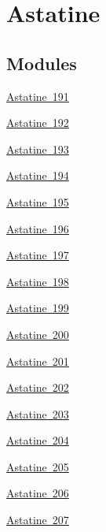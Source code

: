 \hypertarget{group___isotope_const-_astatine}{}\section{Astatine}
\label{group___isotope_const-_astatine}
\subsection*{Modules}
\begin{DoxyCompactItemize}
\item 
\mbox{\hyperlink{group___isotope_const-_astatine-_at191}{Astatine 191}}
\item 
\mbox{\hyperlink{group___isotope_const-_astatine-_at192}{Astatine 192}}
\item 
\mbox{\hyperlink{group___isotope_const-_astatine-_at193}{Astatine 193}}
\item 
\mbox{\hyperlink{group___isotope_const-_astatine-_at194}{Astatine 194}}
\item 
\mbox{\hyperlink{group___isotope_const-_astatine-_at195}{Astatine 195}}
\item 
\mbox{\hyperlink{group___isotope_const-_astatine-_at196}{Astatine 196}}
\item 
\mbox{\hyperlink{group___isotope_const-_astatine-_at197}{Astatine 197}}
\item 
\mbox{\hyperlink{group___isotope_const-_astatine-_at198}{Astatine 198}}
\item 
\mbox{\hyperlink{group___isotope_const-_astatine-_at199}{Astatine 199}}
\item 
\mbox{\hyperlink{group___isotope_const-_astatine-_at200}{Astatine 200}}
\item 
\mbox{\hyperlink{group___isotope_const-_astatine-_at201}{Astatine 201}}
\item 
\mbox{\hyperlink{group___isotope_const-_astatine-_at202}{Astatine 202}}
\item 
\mbox{\hyperlink{group___isotope_const-_astatine-_at203}{Astatine 203}}
\item 
\mbox{\hyperlink{group___isotope_const-_astatine-_at204}{Astatine 204}}
\item 
\mbox{\hyperlink{group___isotope_const-_astatine-_at205}{Astatine 205}}
\item 
\mbox{\hyperlink{group___isotope_const-_astatine-_at206}{Astatine 206}}
\item 
\mbox{\hyperlink{group___isotope_const-_astatine-_at207}{Astatine 207}}
\item 

\end{DoxyCompactItemize}
